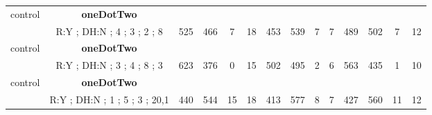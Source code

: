 \begin{table}[]
{\begin{tabular}{|c|c|c|c|c|c|c|c|c|c|c|c|c|c|}
control & \cellcolor{blue!15}\textbf{oneDotTwo}& {\color[HTML]{00009B} } & {\color[HTML]{9A0000} } & {\color[HTML]{009901} } &  & {\color[HTML]{00009B} } & {\color[HTML]{9A0000} } & {\color[HTML]{009901} } &  & {\color[HTML]{00009B} } & {\color[HTML]{9A0000} } & {\color[HTML]{009901} } &  \\ 
 & \cellcolor{ blue!15}R:Y ; DH:N ; 4 ; 3 ; 2 ; 8 & \multirow{-2}{*}{{\color[HTML]{00009B} 525}} & \multirow{-2}{*}{{\color[HTML]{9A0000} 466}} & \multirow{-2}{*}{{\color[HTML]{009901} 7}} & \multirow{-2}{*}{18} & \multirow{-2}{*}{{\color[HTML]{00009B} 453}} & \multirow{-2}{*}{{\color[HTML]{9A0000} 539}} & \multirow{-2}{*}{{\color[HTML]{009901} 7}} & \multirow{-2}{*}{7} & \multirow{-2}{*}{{\color[HTML]{00009B} 489}} & \multirow{-2}{*}{{\color[HTML]{9A0000} 502}} & \multirow{-2}{*}{{\color[HTML]{009901} 7}} & \multirow{-2}{*}{12} \\ \hline

control & \cellcolor{blue!15}\textbf{oneDotTwo}& {\color[HTML]{00009B} } & {\color[HTML]{9A0000} } & {\color[HTML]{009901} } &  & {\color[HTML]{00009B} } & {\color[HTML]{9A0000} } & {\color[HTML]{009901} } &  & {\color[HTML]{00009B} } & {\color[HTML]{9A0000} } & {\color[HTML]{009901} } &  \\ 
 & \cellcolor{ blue!15}R:Y ; DH:N ; 3 ; 4 ; 8 ; 3 & \multirow{-2}{*}{{\color[HTML]{00009B} 623}} & \multirow{-2}{*}{{\color[HTML]{9A0000} 376}} & \multirow{-2}{*}{{\color[HTML]{009901} 0}} & \multirow{-2}{*}{15} & \multirow{-2}{*}{{\color[HTML]{00009B} 502}} & \multirow{-2}{*}{{\color[HTML]{9A0000} 495}} & \multirow{-2}{*}{{\color[HTML]{009901} 2}} & \multirow{-2}{*}{6} & \multirow{-2}{*}{{\color[HTML]{00009B} 563}} & \multirow{-2}{*}{{\color[HTML]{9A0000} 435}} & \multirow{-2}{*}{{\color[HTML]{009901} 1}} & \multirow{-2}{*}{10} \\ \hline

control & \cellcolor{blue!15}\textbf{oneDotTwo}& {\color[HTML]{00009B} } & {\color[HTML]{9A0000} } & {\color[HTML]{009901} } &  & {\color[HTML]{00009B} } & {\color[HTML]{9A0000} } & {\color[HTML]{009901} } &  & {\color[HTML]{00009B} } & {\color[HTML]{9A0000} } & {\color[HTML]{009901} } &  \\ 
 & \cellcolor{ blue!15}R:Y ; DH:N ; 1 ; 5 ; 3 ; 20,1 & \multirow{-2}{*}{{\color[HTML]{00009B} 440}} & \multirow{-2}{*}{{\color[HTML]{9A0000} 544}} & \multirow{-2}{*}{{\color[HTML]{009901} 15}} & \multirow{-2}{*}{18} & \multirow{-2}{*}{{\color[HTML]{00009B} 413}} & \multirow{-2}{*}{{\color[HTML]{9A0000} 577}} & \multirow{-2}{*}{{\color[HTML]{009901} 8}} & \multirow{-2}{*}{7} & \multirow{-2}{*}{{\color[HTML]{00009B} 427}} & \multirow{-2}{*}{{\color[HTML]{9A0000} 560}} & \multirow{-2}{*}{{\color[HTML]{009901} 11}} & \multirow{-2}{*}{12} \\ \hline


\end{tabular}}
\end{table}
